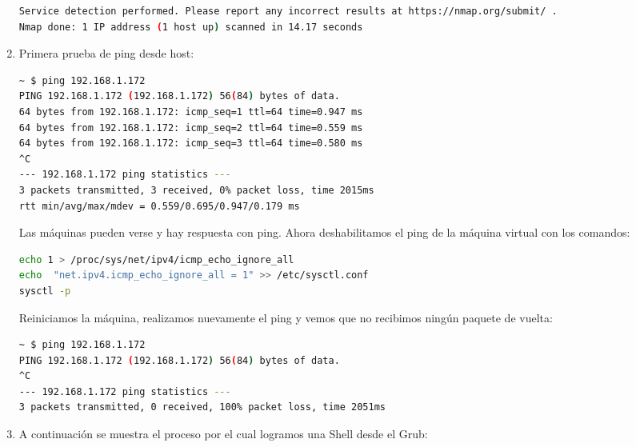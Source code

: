 \documentclass[10pt,a4paper]{article}
\begin{document}
\begin{enumerate}[label=\textbf{\alph*)}]
\begin{lstlisting}[language=bash]
Service detection performed. Please report any incorrect results at https://nmap.org/submit/ .
Nmap done: 1 IP address (1 host up) scanned in 14.17 seconds
\end{lstlisting}

\item Primera prueba de ping desde host:
\begin{lstlisting}[language=bash]
~ $ ping 192.168.1.172
PING 192.168.1.172 (192.168.1.172) 56(84) bytes of data.
64 bytes from 192.168.1.172: icmp_seq=1 ttl=64 time=0.947 ms
64 bytes from 192.168.1.172: icmp_seq=2 ttl=64 time=0.559 ms
64 bytes from 192.168.1.172: icmp_seq=3 ttl=64 time=0.580 ms
^C
--- 192.168.1.172 ping statistics ---
3 packets transmitted, 3 received, 0% packet loss, time 2015ms
rtt min/avg/max/mdev = 0.559/0.695/0.947/0.179 ms
\end{lstlisting}
Las máquinas pueden verse y hay respuesta con ping. Ahora deshabilitamos el ping de la máquina virtual con los comandos: \cite{ping}
\begin{lstlisting}[language=bash]
echo 1 > /proc/sys/net/ipv4/icmp_echo_ignore_all
echo  "net.ipv4.icmp_echo_ignore_all = 1" >> /etc/sysctl.conf
sysctl -p
\end{lstlisting}
Reiniciamos la máquina, realizamos nuevamente el ping y vemos que no recibimos ningún paquete de vuelta:
\begin{lstlisting}[language=bash]
~ $ ping 192.168.1.172
PING 192.168.1.172 (192.168.1.172) 56(84) bytes of data.
^C
--- 192.168.1.172 ping statistics ---
3 packets transmitted, 0 received, 100% packet loss, time 2051ms
\end{lstlisting}

\item A continuación se muestra el proceso por el cual logramos una Shell desde el Grub: \cite{boot}


\end{enumerate}
\end{document}
